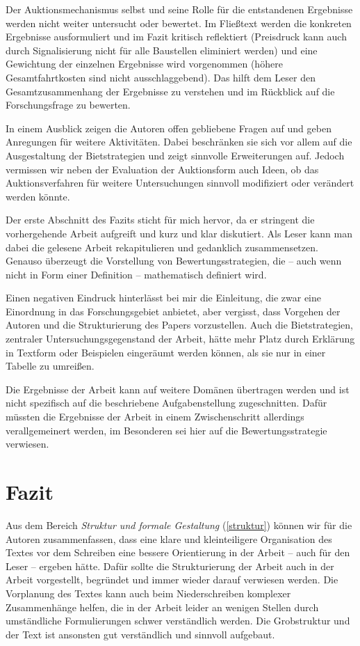 \documentclass[sigconf]{acmart}
\begin{document}
Der Auktionsmechanismus selbst und seine Rolle für die entstandenen Ergebnisse werden nicht weiter untersucht oder bewertet. Im Fließtext werden die konkreten Ergebnisse ausformuliert und im Fazit kritisch reflektiert (Preisdruck kann auch durch Signalisierung nicht für alle Baustellen eliminiert werden) und eine Gewichtung der einzelnen Ergebnisse wird vorgenommen (höhere Gesamtfahrtkosten sind nicht ausschlaggebend). Das hilft dem Leser den Gesamtzusammenhang der Ergebnisse zu verstehen und im Rückblick auf die Forschungsfrage zu bewerten.

In einem Ausblick zeigen die Autoren offen gebliebene Fragen auf und geben Anregungen für weitere Aktivitäten. Dabei beschränken sie sich vor allem auf die Ausgestaltung der Bietstrategien und zeigt sinnvolle Erweiterungen auf. Jedoch vermissen wir neben der Evaluation der Auktionsform auch Ideen, ob das Auktionsverfahren für weitere Untersuchungen sinnvoll modifiziert oder verändert werden könnte.

Der erste Abschnitt des Fazits sticht für mich hervor, da er stringent die vorhergehende Arbeit aufgreift und kurz und klar diskutiert. Als Leser kann man dabei die gelesene Arbeit rekapitulieren und gedanklich zusammensetzen. Genauso überzeugt die Vorstellung von Bewertungsstrategien, die -- auch wenn nicht in Form einer Definition -- mathematisch definiert wird.

Einen negativen Eindruck hinterlässt bei mir die Einleitung, die zwar eine Einordnung in das Forschungsgebiet anbietet, aber vergisst, dass Vorgehen der Autoren und die Strukturierung des Papers vorzustellen. Auch die Bietstrategien, zentraler Untersuchungsgegenstand der Arbeit, hätte mehr Platz durch Erklärung in Textform oder Beispielen eingeräumt werden können, als sie nur in einer Tabelle zu umreißen.

Die Ergebnisse der Arbeit kann auf weitere Domänen übertragen werden und ist nicht spezifisch auf die beschriebene Aufgabenstellung zugeschnitten. Dafür müssten die Ergebnisse der Arbeit in einem Zwischenschritt allerdings verallgemeinert werden, im Besonderen sei hier auf die Bewertungsstrategie verwiesen.

\section{Fazit}
\label{fazit}
Aus dem Bereich \textit{Struktur und formale Gestaltung} (\ref{struktur}) können wir für die Autoren zusammenfassen, dass eine klare und kleinteiligere Organisation des Textes vor dem Schreiben eine bessere Orientierung in der Arbeit -- auch für den Leser -- ergeben hätte. Dafür sollte die Strukturierung der Arbeit auch in der Arbeit vorgestellt, begründet und immer wieder darauf verwiesen werden. Die Vorplanung des Textes kann auch beim Niederschreiben komplexer Zusammenhänge helfen, die in der Arbeit leider an wenigen Stellen durch umständliche Formulierungen schwer verständlich werden. Die Grobstruktur und der Text ist ansonsten gut verständlich und sinnvoll aufgebaut.
\end{document}

